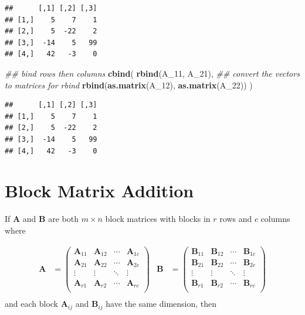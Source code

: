 \documentclass[
]{book}
\newenvironment{Shaded}{\begin{snugshade}}{\end{snugshade}}
\newcommand{\CommentTok}[1]{\textcolor[rgb]{0.56,0.35,0.01}{\textit{#1}}}
\newcommand{\DecValTok}[1]{\textcolor[rgb]{0.00,0.00,0.81}{#1}}
\newcommand{\KeywordTok}[1]{\textcolor[rgb]{0.13,0.29,0.53}{\textbf{#1}}}
\newcommand{\NormalTok}[1]{#1}
\theoremstyle{definition}
\theoremstyle{definition}
\theoremstyle{definition}
\theoremstyle{definition}
\theoremstyle{remark}
\begin{document}
\begin{verbatim}
##      [,1] [,2] [,3]
## [1,]    5    7    1
## [2,]    5  -22    2
## [3,]  -14    5   99
## [4,]   42   -3    0
\end{verbatim}

\begin{Shaded}
\begin{Highlighting}[]
\CommentTok{## bind rows then columns}
\KeywordTok{cbind}\NormalTok{(}
    \KeywordTok{rbind}\NormalTok{(A_}\DecValTok{11}\NormalTok{, A_}\DecValTok{21}\NormalTok{),}
    \CommentTok{## convert the vectors to matrices for rbind}
    \KeywordTok{rbind}\NormalTok{(}\KeywordTok{as.matrix}\NormalTok{(A_}\DecValTok{12}\NormalTok{), }\KeywordTok{as.matrix}\NormalTok{(A_}\DecValTok{22}\NormalTok{))}
\NormalTok{)}
\end{Highlighting}
\end{Shaded}

\begin{verbatim}
##      [,1] [,2] [,3]
## [1,]    5    7    1
## [2,]    5  -22    2
## [3,]  -14    5   99
## [4,]   42   -3    0
\end{verbatim}

\hypertarget{block-matrix-addition}{%
\section{Block Matrix Addition}\label{block-matrix-addition}}

If \(\mathbf{A}\) and \(\mathbf{B}\) are both \(m \times n\) block matrices with blocks in \(r\) rows and \(c\) columns where

\[
\begin{aligned}
\mathbf{A} & =
\begin{pmatrix} \mathbf{A}_{11} & \mathbf{A}_{12} & \cdots & \mathbf{A}_{1c}\\
\mathbf{A}_{21} & \mathbf{A}_{22} &\cdots & \mathbf{A}_{2c} \\
\vdots & \vdots & \ddots & \vdots \\
\mathbf{A}_{r1} & \mathbf{A}_{r2} &\cdots & \mathbf{A}_{rc} \\
\end{pmatrix} &
\mathbf{B} & =
\begin{pmatrix} \mathbf{B}_{11} & \mathbf{B}_{12} & \cdots & \mathbf{B}_{1c}\\
\mathbf{B}_{21} & \mathbf{B}_{22} &\cdots & \mathbf{B}_{2c} \\
\vdots & \vdots & \ddots & \vdots \\
\mathbf{B}_{r1} & \mathbf{B}_{r2} &\cdots & \mathbf{B}_{rc} \\
\end{pmatrix} \\
\end{aligned}
\]
and each block \(\mathbf{A}_{ij}\) and \(\mathbf{B}_{ij}\) have the same dimension, then
\end{document}
